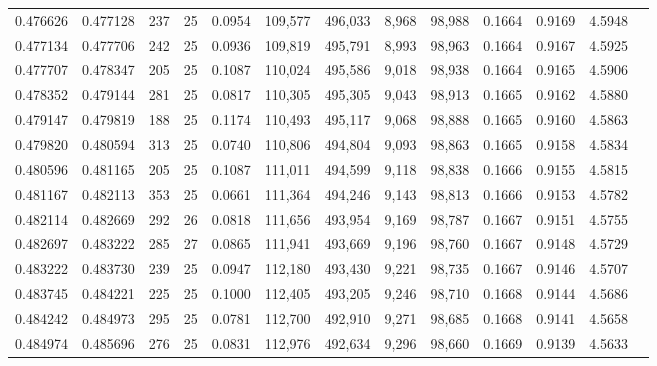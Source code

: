 \begin{tabular}{rrrrrrrrrrrrr}
0.476626 & 0.477128 &   237 &  25 &                                     0.0954 & 109,577 & 496,033 &   8,968 &  98,988 & 0.1664 & 0.9169 & 4.5948 \\
0.477134 & 0.477706 &   242 &  25 &                                     0.0936 & 109,819 & 495,791 &   8,993 &  98,963 & 0.1664 & 0.9167 & 4.5925 \\
0.477707 & 0.478347 &   205 &  25 &                                     0.1087 & 110,024 & 495,586 &   9,018 &  98,938 & 0.1664 & 0.9165 & 4.5906 \\
0.478352 & 0.479144 &   281 &  25 &                                     0.0817 & 110,305 & 495,305 &   9,043 &  98,913 & 0.1665 & 0.9162 & 4.5880 \\
0.479147 & 0.479819 &   188 &  25 &                                     0.1174 & 110,493 & 495,117 &   9,068 &  98,888 & 0.1665 & 0.9160 & 4.5863 \\
0.479820 & 0.480594 &   313 &  25 &                                     0.0740 & 110,806 & 494,804 &   9,093 &  98,863 & 0.1665 & 0.9158 & 4.5834 \\
0.480596 & 0.481165 &   205 &  25 &                                     0.1087 & 111,011 & 494,599 &   9,118 &  98,838 & 0.1666 & 0.9155 & 4.5815 \\
0.481167 & 0.482113 &   353 &  25 &                                     0.0661 & 111,364 & 494,246 &   9,143 &  98,813 & 0.1666 & 0.9153 & 4.5782 \\
0.482114 & 0.482669 &   292 &  26 &                                     0.0818 & 111,656 & 493,954 &   9,169 &  98,787 & 0.1667 & 0.9151 & 4.5755 \\
0.482697 & 0.483222 &   285 &  27 &                                     0.0865 & 111,941 & 493,669 &   9,196 &  98,760 & 0.1667 & 0.9148 & 4.5729 \\
0.483222 & 0.483730 &   239 &  25 &                                     0.0947 & 112,180 & 493,430 &   9,221 &  98,735 & 0.1667 & 0.9146 & 4.5707 \\
0.483745 & 0.484221 &   225 &  25 &                                     0.1000 & 112,405 & 493,205 &   9,246 &  98,710 & 0.1668 & 0.9144 & 4.5686 \\
0.484242 & 0.484973 &   295 &  25 &                                     0.0781 & 112,700 & 492,910 &   9,271 &  98,685 & 0.1668 & 0.9141 & 4.5658 \\
0.484974 & 0.485696 &   276 &  25 &                                     0.0831 & 112,976 & 492,634 &   9,296 &  98,660 & 0.1669 & 0.9139 & 4.5633 \\

\end{tabular}
